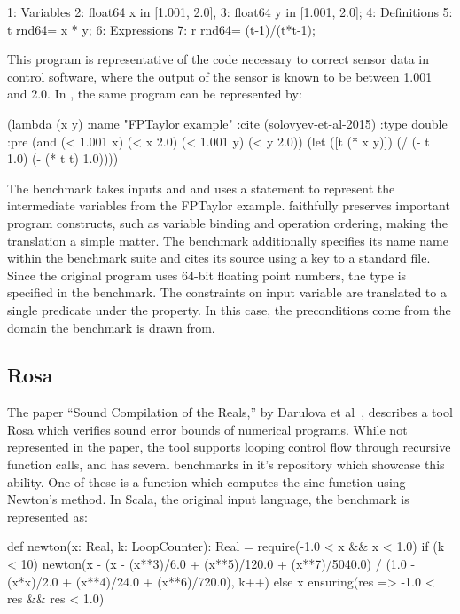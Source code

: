 \documentclass[main.tex]{subfiles}
\begin{document}
\begin{code}
1: Variables
2:   float64 x in [1.001, 2.0],
3:   float64 y in [1.001, 2.0];
4: Definitions
5:   t rnd64= x * y;
6: Expressions
7:   r rnd64= (t-1)/(t*t-1);
\end{code}

This program is representative of the code necessary to correct sensor data
in control software, where the output of the sensor is known to be between
1.001 and 2.0. In \core, the same program can be represented by:

\begin{code}
(lambda (x y)
  :name "FPTaylor example"
  :cite (solovyev-et-al-2015)
  :type double
  :pre (and (< 1.001 x) (< x 2.0) (< 1.001 y) (< y 2.0))
  (let ([t (* x y)])
    (/ (- t 1.0)  (- (* t t) 1.0))))
\end{code}

The benchmark takes inputs  and 
  and uses a  statement to represent the intermediate variables
  from the FPTaylor example.
\core faithfully preserves important program constructs,
  such as variable binding and operation ordering,
  making the translation a simple matter.
The benchmark additionally specifies
  its name name within the benchmark suite
  and cites its source using a key to a standard \BibTeX file.
Since the original program uses 64-bit floating point numbers,
  the type  is specified in the benchmark.
The constraints on input variable are translated to
  a single predicate under the  property.
In this case, the preconditions come from
  the domain the benchmark is drawn from.

\subsection{Rosa}
The paper ``Sound Compilation of the Reals,'' by Darulova et
al~\cite{DarulovaK14}, describes a tool Rosa which verifies sound
error bounds of numerical programs. While not represented in the
paper, the tool supports looping control flow through recursive
function calls, and has several benchmarks in it's repository which
showcase this ability. One of these is a function which computes the
sine function using Newton's method. In Scala, the original input
language, the benchmark is represented as:

\begin{code}
def newton(x: Real, k: LoopCounter): Real = {
  require(-1.0 < x && x < 1.0)
  if (k < 10) {
    newton(x - (x - (x**3)/6.0 + (x**5)/120.0 + (x**7)/5040.0) / 
      (1.0 - (x*x)/2.0 + (x**4)/24.0 + (x**6)/720.0), k++)
  } else {
    x
  }
} ensuring(res => -1.0 < res && res < 1.0)
\end{code}
\end{document}
